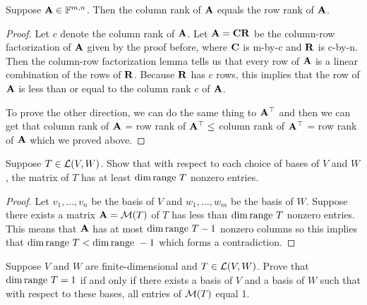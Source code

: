 \documentclass{extarticle}
\begin{document}
\begin{thm}
    Suppose \(\mathbf{A} \in \mathbb{F}^{m, n}\). Then the column rank of \(\mathbf{A}\) equals the row rank of \(\mathbf{A}\). 
\end{thm}

\begin{proof}
Let \(c\) denote the column rank of \(\mathbf{A}\). Let \(\mathbf{A} = \mathbf{C} \mathbf{R}\) be the column-row factorization 
of \(\mathbf{A}\) given by the proof before, where \(\mathbf{C}\) is m-by-c and \(\mathbf{R}\) is c-by-n. Then the 
column-row factorization lemma tells us that every row of \(\mathbf{A}\) is a linear combination of 
the rows of \(\mathbf{R}\). Because \(\mathbf{R}\) has \(c\) rows, this implies that the row of \(\mathbf{A}\) is 
less than or equal to the column rank \(c\) of \(\mathbf{A}\).

To prove the other direction, we can do the same thing to \(\mathbf{A}^\top\) and then we can get that 
column rank of \(\mathbf{A}\) = row rank of \(\mathbf{A}^\top \leq \) column rank of \(\mathbf{A}^\top\) = row 
rank of \(\mathbf{A}\) which we proved above. 
\end{proof}

\newpage 
{}
\begin{problem}{1}
    Suppose \(T \in \mathcal{L} (V, W)\). Show that with respect to each choice of bases of \(V\) and 
    \(W\), the matrix of \(T\) has at least \(\dim \text{range } T\) nonzero entries. 
\end{problem}

\begin{proof}
Let \(v_1, \ldots, v_n\) be the basis of \(V\) and \(w_1, \ldots, w_m\) be the basis of \(W\). 
Suppose there exists a matrix \(\mathbf{A} = \mathcal{M}(T)\) of \(T\) has less than \(\dim \text{range } T\) nonzero 
entries.  This means that \(\mathbf{A}\) has at most \(\dim \text{range } T - 1\) nonzero columns so this implies 
that \(\dim \text{range } T < \dim \text{range } - 1\) which forms a contradiction. 
\end{proof}

\begin{problem}{2}
    Suppose \(V\) and \(W\) are finite-dimensional and \(T \in \mathcal{L}(V, W)\). Prove that 
    \(\dim \text{range } T = 1\) if and only if there exists a basis of \(V\) and a basis of \(W\)
    such that with respect to these bases, all entries of \(\mathcal{M}(T)\) equal 1. 
\end{problem}
\end{document}
